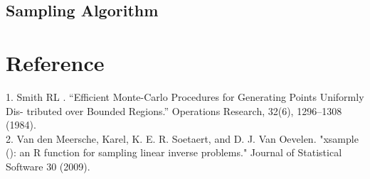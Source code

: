 \documentclass[11 pt, a4paper]{article}  %
\begin{document}
\subsection{Sampling Algorithm}

%





\newpage
\section*{Reference}
1. Smith RL . “Efficient Monte-Carlo Procedures for Generating Points Uniformly Dis- tributed over Bounded Regions.” Operations Research, 32(6), 1296–1308 (1984).\\ 
2. Van den Meersche, Karel, K. E. R. Soetaert, and D. J. Van Oevelen. "xsample (): an R function for sampling linear inverse problems." Journal of Statistical Software 30 (2009).
\end{document}
